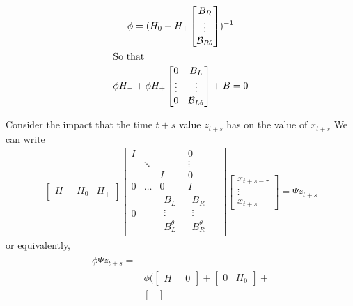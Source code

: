 \documentclass{elsart}
\begin{document}
\begin{prf}
\begin{gather}
  \phi=  (H_0 + H_+  \begin{bmatrix}\label{phiDef}
    B_R\\\vdots\\\mathcal{B}_{R\theta}
  \end{bmatrix})^{-1}\\ \intertext{So that}
\phi H_- + \phi H_+  \begin{bmatrix}
    0&B_L\\\vdots&\vdots\\0&\mathcal{B}_{L\theta}
  \end{bmatrix}  +B = 0\label{phiUse}
\end{gather}

Consider the impact that the time $t+s$ value $z_{t+s}$ has on the
value of $x_{t+s}$
We can write
\begin{gather}
  \begin{bmatrix}
    H_{-}&H_{0}&H_{+}
  \end{bmatrix}
  \begin{bmatrix}
    I&&&0\\&\ddots&&\vdots&\\&&I&0\\
0&\dots&0&I\\
0&&
\begin{matrix}
      B_L\\\vdots\\B_L^\theta
    \end{matrix}&
\begin{matrix}
      B_R\\\vdots\\B_R^\theta
    \end{matrix}
  \end{bmatrix}
  \begin{bmatrix}
    x_{t+s-\tau}\\\vdots\\x_{t+s}
  \end{bmatrix}= \Psi z_{t+s}
\end{gather}
or equivalently,
\begin{gather}
  \begin{split}
\phi\Psi z_{t+s}=&\\
&\phi   (\begin{bmatrix}
H_-&0
  \end{bmatrix} + 
  \begin{bmatrix}
    0&H_0
  \end{bmatrix} + \\
&  \begin{bmatrix}

\end{bmatrix}
\end{split}
\end{gather}
\end{prf}
\end{document}
